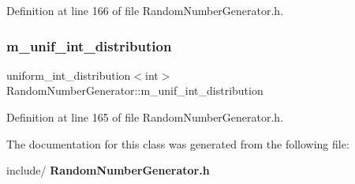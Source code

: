 Definition at line 166 of file Random\+Number\+Generator.\+h.

\mbox{\label{class_random_number_generator_a7a3a5b9bfbb1306f364704bc3a9860b6}} 
\subsubsection{m\_unif\_int\_distribution}
{\footnotesize\ttfamily uniform\+\_\+int\+\_\+distribution$<$int$>$ Random\+Number\+Generator\+::m\+\_\+unif\+\_\+int\+\_\+distribution\hspace{0.3cm}{\ttfamily [private]}}



Definition at line 165 of file Random\+Number\+Generator.\+h.



The documentation for this class was generated from the following file\+:\begin{DoxyCompactItemize}
\item 
include/\textbf{ Random\+Number\+Generator.\+h}\end{DoxyCompactItemize}

